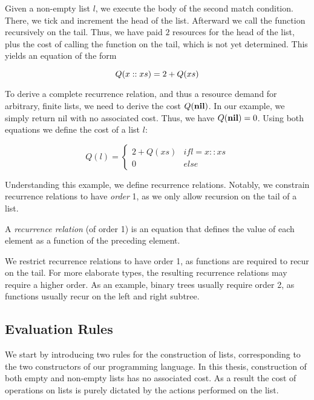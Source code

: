 Given a non-empty list \(l\), we execute the body of the second match condition. There, we tick and increment the head of the list. Afterward we call the function recursively on the tail. Thus, we have paid \(2\) resources for the head of the list, plus the cost of calling the function on the tail, which is not yet determined. This yields an equation of the form 

\[
   Q(x :: xs) = 2 + Q(xs)
\]


To derive a complete recurrence relation, and thus a resource demand for arbitrary, finite lists, we need to derive the cost \(Q(\textbf{nil})\). In our example, we simply return nil with no associated cost. Thus, we have \(Q(\textbf{nil}) = 0\). Using both equations we define the cost of a list \(l\):

\[
   Q(l) = \begin{cases*}
      2 + Q(xs)            & if l = x :: xs\\
      0                    & else
   \end{cases*}
\]

Understanding this example, we define recurrence relations. Notably, we constrain recurrence relations to have \emph{order} 1, as we only allow recursion on the tail of a list. 

\begin{definition}\label{def:recurrence-relation}
   A \emph{recurrence relation} (of order 1) is an equation that defines the value of each element as a function of the preceding element.
\end{definition}

\begin{remark}
   We restrict recurrence relations to have order 1, as functions are required to recur on the tail. For more elaborate types, the resulting recurrence relations may require a higher order. As an example, binary trees usually require order 2, as functions usually recur on the left and right subtree.
\end{remark}

\subsection{Evaluation Rules}

We start by introducing two rules for the construction of lists, corresponding to the two constructors of our programming language. In this thesis, construction of both empty and non-empty lists has no associated cost. As a result the cost of operations on lists is purely dictated by the actions performed on the list. 

